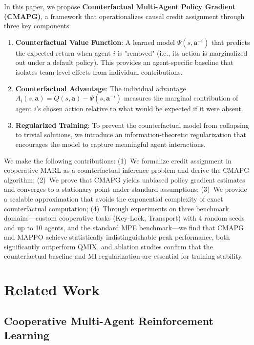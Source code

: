 \documentclass[journal]{IEEEtran}
\begin{document}
In this paper, we propose \textbf{Counterfactual Multi-Agent Policy Gradient (CMAPG)}, a framework that operationalizes causal credit assignment through three key components:

\begin{enumerate}
    \item \textbf{Counterfactual Value Function}: A learned model $\Psi(s, \mathbf{a}^{-i})$ that predicts the expected return when agent $i$ is "removed" (i.e., its action is marginalized out under a default policy). This provides an agent-specific baseline that isolates team-level effects from individual contributions.

    \item \textbf{Counterfactual Advantage}: The individual advantage $A_i(s, \mathbf{a}) = Q(s, \mathbf{a}) - \Psi(s, \mathbf{a}^{-i})$ measures the marginal contribution of agent $i$'s chosen action relative to what would be expected if it were absent.

    \item \textbf{Regularized Training}: To prevent the counterfactual model from collapsing to trivial solutions, we introduce an information-theoretic regularization that encourages the model to capture meaningful agent interactions.
\end{enumerate}

We make the following contributions: (1)~We formalize credit assignment in cooperative MARL as a counterfactual inference problem and derive the CMAPG algorithm; (2)~We prove that CMAPG yields unbiased policy gradient estimates and converges to a stationary point under standard assumptions; (3)~We provide a scalable approximation that avoids the exponential complexity of exact counterfactual computation; (4)~Through experiments on three benchmark domains---custom cooperative tasks (Key-Lock, Transport) with 4 random seeds and up to 10 agents, and the standard MPE benchmark---we find that CMAPG and MAPPO achieve statistically indistinguishable peak performance, both significantly outperform QMIX, and ablation studies confirm that the counterfactual baseline and MI regularization are essential for training stability.

\section{Related Work}
\label{sec:related}

\subsection{Cooperative Multi-Agent Reinforcement Learning}
\end{document}
